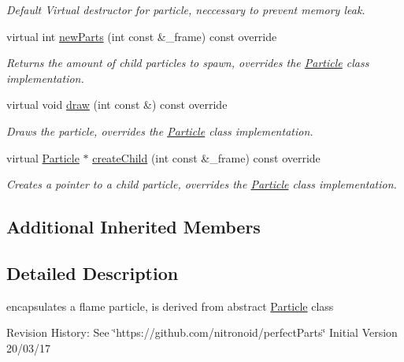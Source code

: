 \begin{DoxyCompactItemize}
\begin{DoxyCompactList}\small\item\em Default Virtual destructor for particle, neccessary to prevent memory leak. \end{DoxyCompactList}\item 
virtual int \hyperlink{classFlameParticle_abe5fd489f2b08f16b6d2722be57c3f5c}{new\-Parts} (int const \&\-\_\-frame) const override
\begin{DoxyCompactList}\small\item\em Returns the amount of child particles to spawn, overrides the \hyperlink{classParticle}{Particle} class implementation. \end{DoxyCompactList}\item 
virtual void \hyperlink{classFlameParticle_a8d0b55a23c44197f404f707a04e1a5f3}{draw} (int const \&) const override
\begin{DoxyCompactList}\small\item\em Draws the particle, overrides the \hyperlink{classParticle}{Particle} class implementation. \end{DoxyCompactList}\item 
virtual \hyperlink{classParticle}{Particle} $\ast$ \hyperlink{classFlameParticle_aac20eda5440173cc4c2e7cd93a73eff0}{create\-Child} (int const \&\-\_\-frame) const override
\begin{DoxyCompactList}\small\item\em Creates a pointer to a child particle, overrides the \hyperlink{classParticle}{Particle} class implementation. \end{DoxyCompactList}\end{DoxyCompactItemize}
\subsection*{Additional Inherited Members}


\subsection{Detailed Description}
encapsulates a flame particle, is derived from abstract \hyperlink{classParticle}{Particle} class 

Revision History\-: See \char`\"{}https\-://github.\-com/nitronoid/perfect\-Parts\char`\"{} Initial Version 20/03/17 

